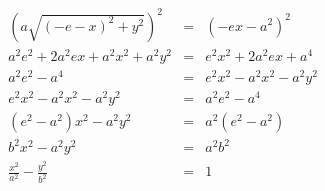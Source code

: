 \begin{frame}
\begin{displaymath}
	\begin{array}{rcl}
		\left (a\sqrt{{(-e-x)}^2 + y^2}\right )^2 & = & \left(-ex - a^2\right)^2\\
		a^2e^2 + 2a^2ex + a^2x^2 + a^2y^2 &=& e^2x^2 + 2a^2ex + a^4\\
		a^2e^2 - a^4 &=& e^2x^2 - a^2x^2 - a^2y^2\\
		e^2x^2 - a^2x^2 - a^2y^2 &=& a^2e^2 - a^4\\
		\left(e^2 - a^2\right)x^2 - a^2y^2 &=& a^2\left(e^2 - a^2\right)\\
		b^2x^2 - a^2y^2 &=& a^2b^2\\
		\frac{x^2}{a^2} - \frac{y^2}{b^2} &=& 1
	\end{array}
\end{displaymath}
\end{frame}